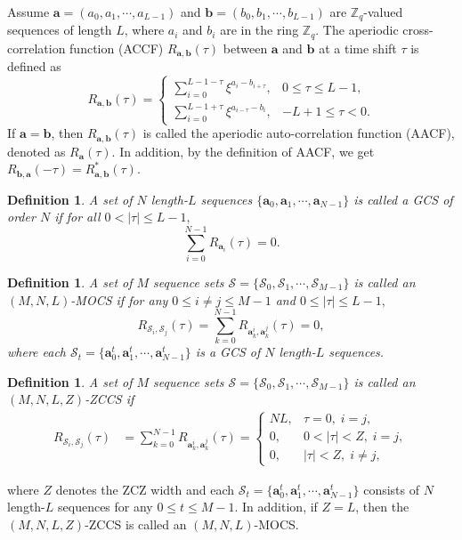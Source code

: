 \documentclass[11pt]{article}
\newcommand{\2} {$2$-to-$1$}
\newtheorem{Def}[thm]{\bfseries  Definition}
\begin{document}
Assume $\mathbf{a}=(a_{0},a_{1},\cdots,a_{L-1})$ and $\mathbf{b}=(b_{0},b_{1},\cdots,b_{L-1})$ are $\mathbb{Z}_{q}$-valued sequences of length $L$, where $a_{i}$ and $b_{i}$ are in the ring $\mathbf{\mathbb{Z}}_{q}$. The aperiodic cross-correlation function (ACCF) $R_{\mathbf{a},\mathbf{b}}(\tau)$ between $\mathbf{a}$ and $\mathbf{b}$ at a time shift $\tau$ is defined as
$$R_{\mathbf{a},\mathbf{b}}(\tau)
=\left\{\begin{array}{ll}
	\sum_{i=0}^{L-1-\tau}\xi^{a_{i}-b_{i+\tau}}, &0\leq \tau \leq L-1, \\
	\sum_{i=0}^{L-1+\tau} \xi^{a_{i-\tau}-b_{i}}, &-L+1 \leq \tau<0.
\end{array}\right. $$
If $\mathbf{a}=\mathbf{b}$, then $R_{\mathbf{a},\mathbf{b}}(\tau)$ is called the aperiodic auto-correlation function (AACF), denoted as $R_{\mathbf{a}}(\tau)$. In addition, by the definition of AACF, we get $R_{\mathbf{b},\mathbf{a}}(-\tau)=R^{*}_{\mathbf{a},\mathbf{b}}(\tau).$
\begin{Def}
	A set of $N$ length-$L$ sequences $\{\mathbf{a}_{0},\mathbf{a}_{1},\cdots,\mathbf{a}_{N-1}\}$ is called a GCS of order $N$ if for all $0<|\tau|\leq L-1,$
	$$\sum^{N-1}_{i=0}R_{\mathbf{a}_{i}}(\tau)=0.$$
\end{Def}


\begin{Def}
	A set of $M$ sequence sets $\mathcal{S}=\{\mathcal{S}_{0},\mathcal{S}_{1},\cdots,\mathcal{S}_{M-1}\}$ is called an $(M,N,L)$-MOCS if for any  $0\leq i\neq j\leq M-1$ and $0\leq|\tau|\leq L-1,$
	$$R_{\mathcal{S}_{i}, \mathcal{S}_{j}}(\tau)=\sum^{N-1}_{k=0}R_{\mathbf{a}^{i}_{k},\mathbf{a}^{j}_{k}}(\tau)=0,$$
	where each $\mathcal{S}_{t}=\{\mathbf{a}^{t}_{0},\mathbf{a}^{t}_{1},\cdots,\mathbf{a}^{t}_{N-1}\}$ is a GCS of $N$ length-$L$ sequences.
\end{Def}

\begin{Def}
	A set of $M$ sequence sets $\mathcal{S}=\{\mathcal{S}_{0},\mathcal{S}_{1},\cdots,\mathcal{S}_{M-1}\}$ is called an $(M,N,L,Z)$-ZCCS if
	$$\begin{aligned}
		R_{\mathcal{S}_{i}, \mathcal{S}_{j}}(\tau)
		&=\sum_{k=0}^{N-1} R_{\mathbf{a}^i_{k},\mathbf{a}^{j}_{k}}(\tau)
		=\left\{\begin{array}{ll}NL, & \tau=0, \;i=j, \\
			0, & 0<|\tau|<Z, \; i=j, \\
			0, & |\tau|<Z, \;i\neq j,
		\end{array}\right.\end{aligned}$$
\end{Def}
\noindent where $Z$ denotes the ZCZ width and each $\mathcal{S}_{t}=\{\mathbf{a}^{t}_{0},\mathbf{a}^{t}_{1},\cdots,\mathbf{a}^{t}_{N-1}\}$ consists of $N$ length-$L$ sequences for any $0\leq t\leq M-1$. In addition, if $Z=L$, then the $(M,N,L,Z)$-ZCCS is called an $(M,N,L)$-MOCS.
\end{document}
